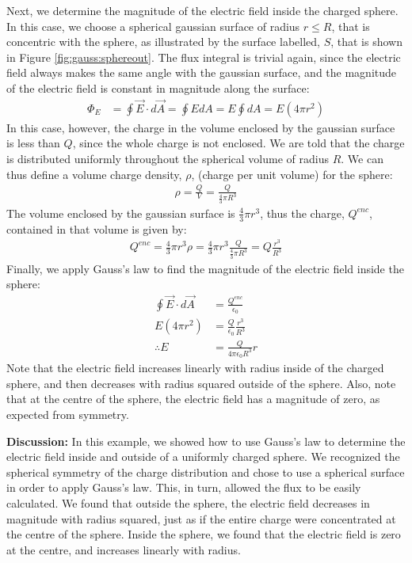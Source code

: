 \begin{example}
Next, we determine the magnitude of the electric field inside the charged sphere. In this case, we choose a spherical gaussian surface of radius $r\leq R$, that is concentric with the sphere, as illustrated by the surface labelled, $S$, that is shown in Figure \ref{fig:gauss:sphereout}.
The flux integral is trivial again, since the electric field always makes the same angle with the gaussian surface, and the magnitude of the electric field is constant in magnitude along the surface:
\begin{align*}
\Phi_E&=\oint \vec E\cdot d\vec A=\oint E dA= E\oint dA=E(4\pi r^2)
\end{align*}
In this case, however, the charge in the volume enclosed by the gaussian surface is less than $Q$, since the whole charge is not enclosed. We are told that the charge is distributed uniformly throughout the spherical volume of radius $R$. We can thus define a volume charge density, $\rho$, (charge per unit volume) for the sphere:
\begin{align*}
\rho=\frac{Q}{V}=\frac{Q}{\frac{4}{3}\pi R^3}
\end{align*}
The volume enclosed by the gaussian surface is $\frac{4}{3}\pi r^3$, thus the charge, $Q^{enc}$, contained in that volume is given by:
\begin{align*}
Q^{enc}=\frac{4}{3}\pi r^3 \rho=\frac{4}{3}\pi r^3 \frac{Q}{\frac{4}{3}\pi R^3}=Q\frac{r^3}{R^3}
\end{align*}
Finally, we apply Gauss's law to find the magnitude of the electric field inside the sphere:
\begin{align*}
\oint \vec E\cdot d\vec A&=\frac{Q^{enc}}{\epsilon_0} \\
E(4\pi r^2) &=\frac{Q}{\epsilon_0}\frac{r^3}{R^3}\\
\therefore E&= \frac{Q}{4\pi\epsilon_0R^3}r
\end{align*}
Note that the electric field increases linearly with radius inside of the charged sphere, and then decreases with radius squared outside of the sphere. Also, note that at the centre of the sphere, the electric field has a magnitude of zero, as expected from symmetry.

\textbf{Discussion: } In this example, we showed how to use Gauss's law to determine the electric field inside and outside of a uniformly charged sphere. We recognized the spherical symmetry of the charge distribution and chose to use a spherical surface in order to apply Gauss's law.  This, in turn, allowed the flux to be easily calculated. We found that outside the sphere, the electric field decreases in magnitude with radius squared, just as if the entire charge were concentrated at the centre of the sphere. Inside the sphere, we found that the electric field is zero at the centre, and increases linearly with radius. 
\end{example}

